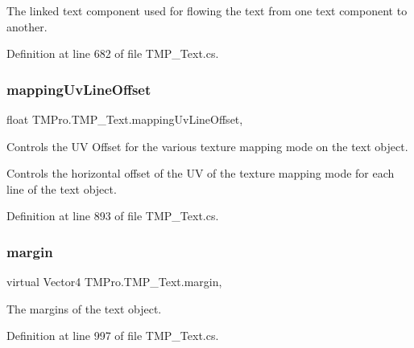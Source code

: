 The linked text component used for flowing the text from one text component to another. 



Definition at line 682 of file T\+M\+P\+\_\+\+Text.\+cs.

\mbox{\label{class_t_m_pro_1_1_t_m_p___text_a09c20ff5fa1b5a03b0c9d996449668da}} 
\subsubsection{\texorpdfstring{mappingUvLineOffset}{mappingUvLineOffset}}
{\footnotesize\ttfamily float T\+M\+Pro.\+T\+M\+P\+\_\+\+Text.\+mapping\+Uv\+Line\+Offset\hspace{0.3cm}{\ttfamily [get]}, {\ttfamily [set]}}



Controls the UV Offset for the various texture mapping mode on the text object. 

Controls the horizontal offset of the UV of the texture mapping mode for each line of the text object. 

Definition at line 893 of file T\+M\+P\+\_\+\+Text.\+cs.

\mbox{\label{class_t_m_pro_1_1_t_m_p___text_a4b5ff3199be4781bc7b033d780bfb547}} 
\subsubsection{\texorpdfstring{margin}{margin}}
{\footnotesize\ttfamily virtual Vector4 T\+M\+Pro.\+T\+M\+P\+\_\+\+Text.\+margin\hspace{0.3cm}{\ttfamily [get]}, {\ttfamily [set]}}



The margins of the text object. 



Definition at line 997 of file T\+M\+P\+\_\+\+Text.\+cs.

\mbox{\label{class_t_m_pro_1_1_t_m_p___text_ab14de74ba7d6eb4609f428cc78f4a3fa}} 
